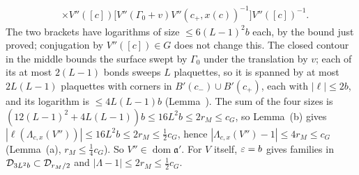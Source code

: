\begin{detail}
\begin{step}
\[\begin{aligned}
&\times V''([c])\big[V''(\Gamma_0+v)V''(c_+,x(c))^{-1}\big]V''([c])^{-1}.
\end{aligned}
\]
The two brackets have logarithms of size $\le6(L-1)^2b$ each, by the bound just proved; conjugation by $V''([c])\in G$ does not change this. The closed contour in the middle bounds the surface swept by $\Gamma_0$ under the translation by $v$; each of its at most $2(L-1)$ bonds sweeps $L$ plaquettes, so it is spanned by at most $2L(L-1)$ plaquettes with corners in $B'(c_-)\cup B'(c_+)$, each with $|\ell|\le2b$, and its logarithm is $\le4L(L-1)b$ (Lemma~). The sum of the four sizes is $(12(L-1)^2+4L(L-1))b\le16L^2b\le2r_M\le c_G$, so Lemma~(b) gives $|\ell(\Lambda_{c,x}(V''))|\le16L^2b\le2r_M\le\frac12c_G$, hence $|\Lambda_{c,x}(V'')-1|\le4r_M\le c_G$ (Lemma~(a), $r_M\le\frac14c_G$). So $V''\in\operatorname{dom}\mathfrak a'$. For $V$ itself, $\varepsilon=b$ gives families in $\mathcal D_{3L^2b}\subset\mathcal D_{r_M/2}$ and $|\Lambda-1|\le2r_M\le\frac12c_G$.
\end{step}
\end{detail}

